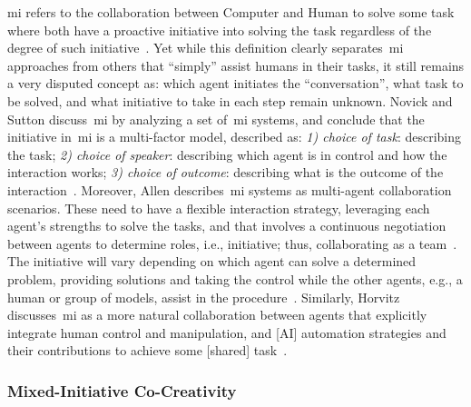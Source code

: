 \acrfull{mi} refers to the collaboration between Computer and Human to solve some task where both have a proactive initiative into solving the task regardless of the degree of such initiative~\cite{liapis_searching_2014}. Yet while this definition clearly separates~\acrshort{mi} approaches from others that ``simply'' assist humans in their tasks, it still remains a very disputed concept as: which agent initiates the ``conversation'', what task to be solved, and what initiative to take in each step remain unknown. Novick and Sutton discuss~\acrshort{mi} by analyzing a set of~\acrshort{mi} systems, and conclude that the initiative in~\acrshort{mi} is a multi-factor model, described as: \textit{1) choice of task}: describing the task; \textit{2) choice of speaker}: describing which agent is in control and how the interaction works; \textit{3) choice of outcome}: describing what is the outcome of the interaction~\cite{novick_what_1997}. Moreover, Allen describes~\acrshort{mi} systems as multi-agent collaboration scenarios. These need to have a flexible interaction strategy, leveraging each agent's strengths to solve the tasks, and that involves a continuous negotiation between agents to determine roles, i.e., initiative; thus, collaborating as a team~\cite{allen_mixed-initiative_1999}. The initiative will vary depending on which agent can solve a determined problem, providing solutions and taking the control while the other agents, e.g., a human or group of models, assist in the procedure~\cite{ferguson_mixed-initiative_2007}. Similarly, Horvitz discusses~\acrshort{mi} as a more natural collaboration between agents that explicitly integrate human control and manipulation, and [AI] automation strategies and their contributions to achieve some [shared] task~\cite{horvitz_uncertainty_1999,horvitz_principles_1999}.


\subsubsection{Mixed-Initiative Co-Creativity}


